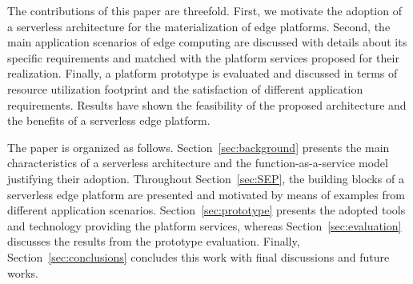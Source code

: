 \documentclass[letterpaper, 10 pt, conference]{ieeeconf}  %
\begin{document}
The contributions of this paper are threefold. First, we motivate the adoption of a serverless architecture for the materialization of edge platforms. Second, the main application scenarios of edge computing are discussed with details about its specific requirements and matched with the platform services proposed for their realization. Finally, a platform prototype is evaluated and discussed in terms of resource utilization footprint and the satisfaction of different application requirements. Results have shown the feasibility of the proposed architecture and the benefits of a serverless edge platform.



The paper is organized as follows. Section~\ref{sec:background} presents the main characteristics of a serverless architecture and the function-as-a-service model justifying their adoption. Throughout Section~\ref{sec:SEP}, the building blocks of a serverless edge platform are presented and motivated by means of examples from different application scenarios. Section~\ref{sec:prototype} presents the adopted tools and technology providing the platform services, whereas Section~\ref{sec:evaluation} discusses the results from the prototype evaluation. Finally, Section~\ref{sec:conclusions} concludes this work with final discussions and future works.





\end{document}

